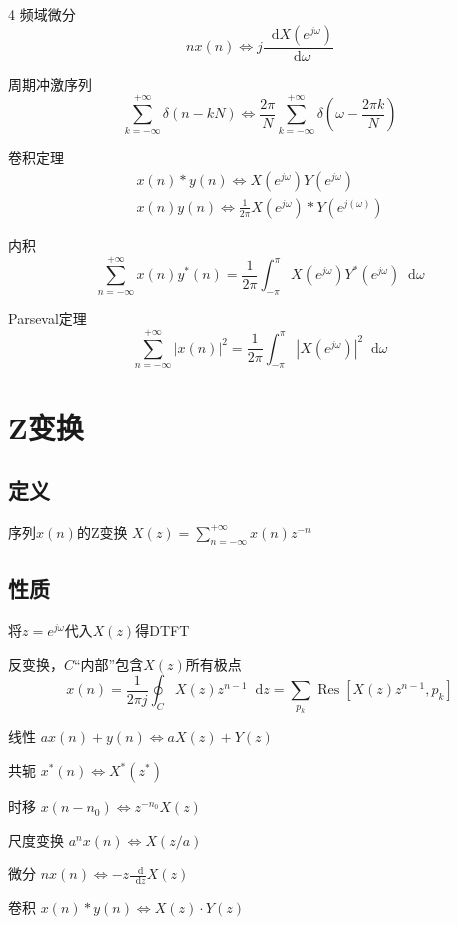 \documentclass[8pt, a4paper]{extarticle}
\newcommand*{\dif}{\mathop{}\!\mathrm{d}}
\DeclareMathOperator{\Res}{Res}
\begin{document}
\begin{multicols}{4}
频域微分
\[
n x(n)\Leftrightarrow j\frac{\dif X(e^{j\omega})}{\dif \omega}
\]

周期冲激序列
\[
\sum_{k=-\infty}^{+\infty}\delta(n-kN)\Leftrightarrow \frac{2\pi}{N}\sum_{k=-\infty}^{+\infty}\delta\left(\omega-\frac{2\pi k}{N}\right)
\]

卷积定理
\begin{gather*}
x(n)\ast y(n)\Leftrightarrow X(e^{j\omega})Y(e^{j\omega})\\
x(n)y(n)\Leftrightarrow \frac{1}{2\pi} X(e^{j\omega})\ast Y(e^{j(\omega)})
\end{gather*}

内积
\[
\sum_{n=-\infty}^{+\infty}x(n)y^*(n)=\frac{1}{2\pi}\int_{-\pi}^{\pi}X(e^{j\omega})Y^*(e^{j\omega})\dif \omega
\]

Parseval定理
\[
\sum_{n=-\infty}^{+\infty}|x(n)|^2=\frac{1}{2\pi}\int_{-\pi}^{\pi}\left|X(e^{j\omega})\right|^2\dif \omega
\]

\section{Z变换}
\subsection{定义}
序列\(x(n)\)的Z变换
\(
X(z)=\sum_{n=-\infty}^{+\infty}x(n)z^{-n}
\)
\subsection{性质}
将\(z=e^{j\omega}\)代入\(X(z)\)得DTFT

反变换，\(C\)“内部”包含\(X(z)\)所有极点
\[
x(n)=\frac{1}{2\pi j}\oint_{C}X(z)z^{n-1}\dif z=\sum_{p_k}\Res[X(z)z^{n-1}, p_k]
\]

线性
\(
ax(n)+y(n)\Leftrightarrow aX(z)+Y(z)
\)

共轭
\(
x^*(n) \Leftrightarrow X^*(z^*)
\)

时移
\(
x(n-n_0) \Leftrightarrow z^{-n_0}X(z)
\)

尺度变换
\(
a^n x(n) \Leftrightarrow X(z/a)
\)

微分
\(
nx(n)\Leftrightarrow -z\frac{\dif}{\dif z}X(z)
\)

卷积
\(
x(n)\ast y(n)\Leftrightarrow X(z)\cdot Y(z)
\)


\end{multicols}
\end{document}
